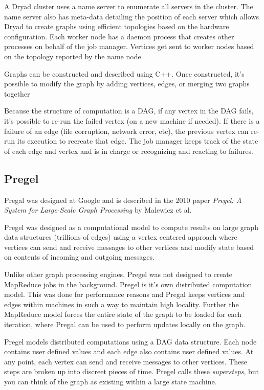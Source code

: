 \documentclass[]{article}
\begin{document}
A Dryad cluster uses a name server to enumerate all servers in the cluster. The name server also has meta-data detailing the position of each server which allows Dryad to create graphs using efficient topologies based on the hardware configuration. Each worker node has a daemon process that creates other processes on behalf of the job manager. Vertices get sent to worker nodes based on the topology reported by the name node.

Graphs can be constructed and described using C++. Once constructed, it's possible to modify the graph by adding vertices, edges, or merging two graphs together

Because the structure of computation is a DAG, if any vertex in the DAG fails, it's possible to re-run the failed vertex (on a new machine if needed). If there is a failure of an edge (file corruption, network error, etc), the previous vertex can re-run its execution to recreate that edge. The job manager keeps track of the state of each edge and vertex and is in charge or recognizing and reacting to failures.

\subsection{Pregel}\label{ssec:pregel}
Pregal was designed at Google and is described in the 2010 paper \textit{Pregel: A System for Large-Scale Graph Processing}\cite{malewicz_pregel:_2010} by Malewicz et al. 

Pregel was designed as a computational model to compute results on large graph data structures (trillions of edges) using a vertex centered approach where vertices can send and receive messages to other vertices and modify state based on contents of incoming and outgoing messages. 

Unlike other graph processing engines, Pregel was not designed to create MapReduce jobs in the background. Pregel is it's own distributed computation model. This was done for performance reasons and Pregal keeps vertices and edges within machines in such a way to maintain high locality. Further the MapReduce model forces the entire state of the graph to be loaded for each iteration, where Pregal can be used to perform updates locally on the graph.

Pregel models distributed computations using a DAG data structure. Each node contains user defined values and each edge also contains user defined values. At any point, each vertex can send and receive messages to other vertices. These steps are broken up into discreet pieces of time. Pregel calls these \textit{supersteps}, but you can think of the graph as existing within a large state machine.
\end{document}
